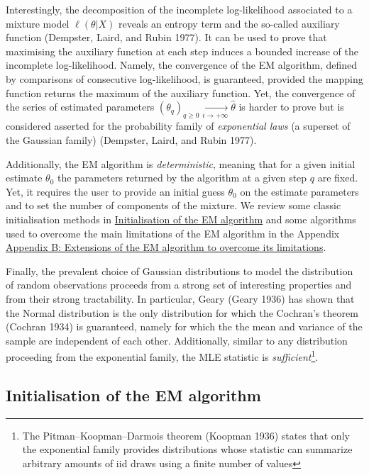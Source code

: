 Interestingly, the decomposition of the incomplete log-likelihood
associated to a mixture model \(\ell(\theta|X)\) reveals an entropy term
and the so-called auxiliary function (Dempster, Laird, and Rubin 1977). It can be used to prove that
maximising the auxiliary function at each step induces a bounded
increase of the incomplete log-likelihood. Namely, the convergence of
the EM algorithm, defined by comparisons of consecutive log-likelihood,
is guaranteed, provided the mapping function returns the maximum of the
auxiliary function. Yet, the convergence of the series of estimated
parameters
\((\theta_q)_{q \ge 0} \underset{i\to +\infty}{\longrightarrow} \hat{\theta}\)
is harder to prove but is considered asserted for the probability family
of \emph{exponential laws} (a superset of the Gaussian family)
(Dempster, Laird, and Rubin 1977).

Additionally, the EM algorithm is \emph{deterministic}, meaning that for a
given initial estimate \(\theta_0\) the parameters returned by the
algorithm at a given step \(q\) are fixed. Yet, it requires the user to
provide an initial guess \(\theta_0\) on the estimate parameters and to
set the number of components of the mixture. We review some classic
initialisation methods in \protect\hyperlink{initialisation-of-the-em-algorithm}{Initialisation of the EM algorithm} and some
algorithms used to overcome the main limitations of the EM
algorithm in the Appendix \protect\hyperlink{appendix-b-extensions-of-the-em-algorithm-to-overcome-its-limitations}{Appendix B: Extensions of the EM algorithm to overcome its limitations}.

Finally, the prevalent choice of Gaussian distributions to model the distribution of random observations proceeds from a strong set of interesting properties and from their strong tractability. In particular, Geary (Geary 1936) has shown that the Normal distribution is the only distribution for which the Cochran's theorem (Cochran 1934) is guaranteed, namely for which the the mean and variance of the sample are independent of each other. Additionally, similar to any distribution proceeding from the exponential family, the MLE statistic is \emph{sufficient}\footnote{The Pitman--Koopman--Darmois theorem (Koopman 1936) states that only the exponential family provides distributions whose statistic can summarize arbitrary amounts of iid draws using a finite number of values}.

\hypertarget{initialisation-of-the-em-algorithm}{%
\subsection{Initialisation of the EM algorithm}\label{initialisation-of-the-em-algorithm}}

